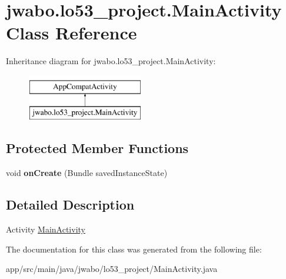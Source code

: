 \hypertarget{classjwabo_1_1lo53__project_1_1_main_activity}{}\section{jwabo.\+lo53\+\_\+project.\+Main\+Activity Class Reference}
\label{classjwabo_1_1lo53__project_1_1_main_activity}
Inheritance diagram for jwabo.\+lo53\+\_\+project.\+Main\+Activity\+:\begin{figure}[H]
\begin{center}
\leavevmode
\includegraphics[height=2.000000cm]{classjwabo_1_1lo53__project_1_1_main_activity}
\end{center}
\end{figure}
\subsection*{Protected Member Functions}
\begin{DoxyCompactItemize}
\item 
void {\bfseries on\+Create} (Bundle saved\+Instance\+State)\hypertarget{classjwabo_1_1lo53__project_1_1_main_activity_ac9fde4f7b8610d56e2b8cbb2fc4bcfa9}{}\label{classjwabo_1_1lo53__project_1_1_main_activity_ac9fde4f7b8610d56e2b8cbb2fc4bcfa9}

\end{DoxyCompactItemize}


\subsection{Detailed Description}
Activity \hyperlink{classjwabo_1_1lo53__project_1_1_main_activity}{Main\+Activity} 

The documentation for this class was generated from the following file\+:\begin{DoxyCompactItemize}
\item 
app/src/main/java/jwabo/lo53\+\_\+project/Main\+Activity.\+java\end{DoxyCompactItemize}

